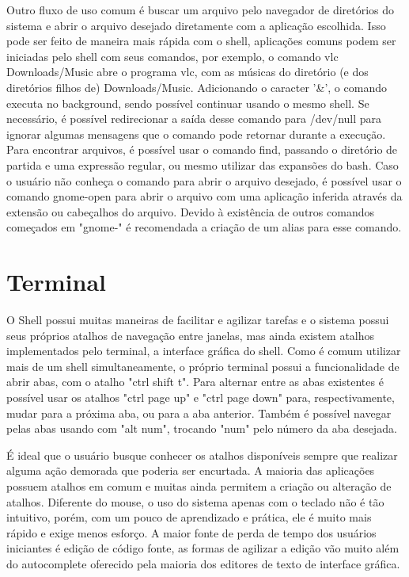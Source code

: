 \documentclass[oneside, 11 pt]{article}
\begin{document}
	Outro fluxo de uso comum é buscar um arquivo pelo navegador de diretórios do sistema e abrir o arquivo desejado diretamente com a aplicação escolhida. Isso pode ser feito de maneira mais rápida com o shell, aplicações comuns podem ser iniciadas pelo shell com seus comandos, por exemplo, o comando vlc Downloads/Music abre o programa vlc, com as músicas do diretório (e dos diretórios filhos de) Downloads/Music. Adicionando o caracter '\&', o comando executa no background, sendo possível continuar usando o mesmo shell. Se necessário, é possível redirecionar a saída desse comando para /dev/null para ignorar algumas mensagens que o comando pode retornar durante a execução.
	Para encontrar arquivos, é possível usar o comando find, passando o diretório de partida e uma expressão regular, ou mesmo utilizar das expansões do bash.
	Caso o usuário não conheça o comando para abrir o arquivo desejado, é possível usar o comando gnome-open para abrir o arquivo com uma aplicação inferida através da extensão ou cabeçalhos do arquivo. Devido à existência de outros comandos começados em "gnome-" é recomendada a criação de um alias para esse comando.
	
	\section{Terminal}
	O Shell possui muitas maneiras de facilitar e agilizar tarefas e o sistema possui seus próprios atalhos de navegação entre janelas, mas ainda existem atalhos implementados pelo terminal, a interface gráfica do shell. Como é comum utilizar mais de um shell simultaneamente, o próprio terminal possui a funcionalidade de abrir abas, com o atalho "ctrl shift t". Para alternar entre as abas existentes é possível usar os atalhos "ctrl page up" e "ctrl page down" para, respectivamente, mudar para a próxima aba, ou para a aba anterior. Também é possível navegar pelas abas usando com "alt num", trocando "num" pelo número da aba desejada.	
	
	É ideal que o usuário busque conhecer os atalhos disponíveis sempre que realizar alguma ação demorada que poderia ser encurtada. A maioria das aplicações possuem atalhos em comum e muitas ainda permitem a criação ou alteração de atalhos. Diferente do mouse, o uso do sistema apenas com o teclado não é tão intuitivo, porém, com um pouco de aprendizado e prática, ele é muito mais rápido e exige menos esforço. A maior fonte de perda de tempo dos usuários iniciantes é edição de código fonte, as formas de agilizar a edição vão muito além do autocomplete oferecido pela maioria dos editores de texto de interface gráfica.
	
\end{document}
